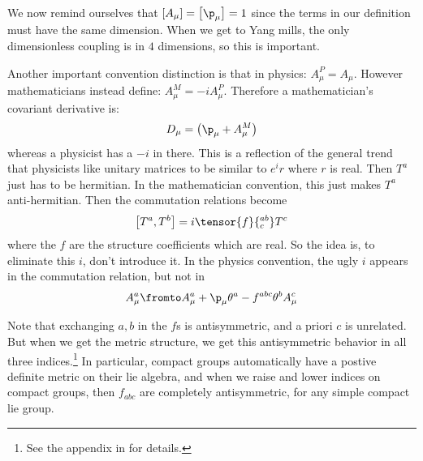 \documentclass{booc}
\begin{document}
We now remind ourselves that $\left[ A_\mu \right] = \left[ \p_\mu \right] = 1$
since the terms in our definition must have the same dimension.
When we get to Yang mills, the only dimensionless coupling is in $4$ dimensions, 
so this is important.

Another important convention distinction is that
in physics:
$A_\mu^P = A_\mu$.
However mathematicians instead define:
$A_\mu^M = -i A_\mu^P$. 
Therefore a mathematician's covariant derivative is:
\begin{equation}
D_\mu = \left( \p_\mu + A_\mu^M \right)
\end{equation}
whereas a physicist has a $-i$ in there. 
This is a reflection of the general trend
that physicists like unitary matrices to be similar to $e^i r$ where $r$ is real.
Then $T^a$ just has to be hermitian.
In the mathematician convention, this just makes $T^a$ anti-hermitian. 
Then the commutation relations become
\begin{equation}
\left[ T^a , T^b \right] = 
i\tensor{f}{^{ab}_c} T^c
\end{equation}
where the $f$ are the structure coefficients which are real. 
So the idea is, to eliminate this $i$, don't introduce it. 
In the physics convention, the ugly $i$ appears in the commutation relation, but not in
\begin{equation}
A_\mu^a \fromto
A_\mu^a + \p_\mu \theta^a - f^{abc}\theta^b A_\mu^c
\end{equation}

\begin{rmk}
Note that exchanging $a,b$ in the $f$s is antisymmetric, and a priori $c$ is unrelated. 
But when we get the metric structure, we get this antisymmetric behavior in all
three indices.\footnote{
See the appendix in \cite{weinberg_2} for details.}
In particular, compact groups automatically have a postive definite metric on their lie algebra, 
and when we raise and lower indices
on compact groups, then $f_{abc}$ are completely antisymmetric, for any simple compact lie group.
\end{rmk}
\end{document}
